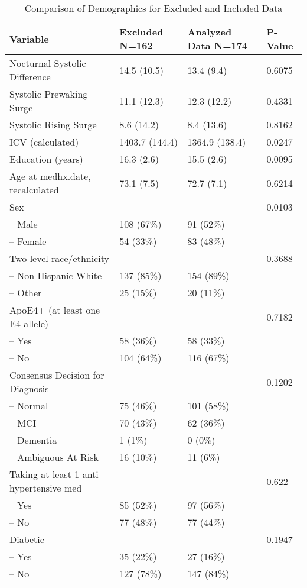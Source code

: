 \documentclass[10pt]{article}\usepackage[]{graphicx}\usepackage[]{color}
\begin{document}
\begin{table}[ht]
\centering
\caption{Comparison of Demographics for Excluded and Included Data} 
\begin{tabular}{llll}
  \toprule
Variable & \parbox{.5in}{Excluded N=162} & \parbox{.9in}{Analyzed Data N=174} & P-Value \\ 
  \midrule
Nocturnal Systolic Difference & 14.5 (10.5) & 13.4 (9.4) & 0.6075 \\ 
  Systolic Prewaking Surge & 11.1 (12.3) & 12.3 (12.2) & 0.4331 \\ 
  Systolic Rising Surge & 8.6 (14.2) & 8.4 (13.6) & 0.8162 \\ 
  ICV (calculated) & 1403.7 (144.4) & 1364.9 (138.4) & 0.0247 \\ 
  Education (years) & 16.3 (2.6) & 15.5 (2.6) & 0.0095 \\ 
  Age at medhx.date, recalculated & 73.1 (7.5) & 72.7 (7.1) & 0.6214 \\ 
  Sex &  &  & 0.0103 \\ 
  -- Male & 108 (67\%) & 91 (52\%) &  \\ 
  -- Female & 54 (33\%) & 83 (48\%) &  \\ 
  Two-level race/ethnicity &  &  & 0.3688 \\ 
  -- Non-Hispanic White & 137 (85\%) & 154 (89\%) &  \\ 
  -- Other & 25 (15\%) & 20 (11\%) &  \\ 
  ApoE4+ (at least one E4 allele) &  &  & 0.7182 \\ 
  -- Yes & 58 (36\%) & 58 (33\%) &  \\ 
  -- No & 104 (64\%) & 116 (67\%) &  \\ 
  Consensus Decision for Diagnosis &  &  & 0.1202 \\ 
  -- Normal & 75 (46\%) & 101 (58\%) &  \\ 
  -- MCI & 70 (43\%) & 62 (36\%) &  \\ 
  -- Dementia & 1 (1\%) & 0 (0\%) &  \\ 
  -- Ambiguous At Risk & 16 (10\%) & 11 (6\%) &  \\ 
  Taking at least 1 anti-hypertensive med &  &  & 0.622 \\ 
  -- Yes & 85 (52\%) & 97 (56\%) &  \\ 
  -- No & 77 (48\%) & 77 (44\%) &  \\ 
  Diabetic &  &  & 0.1947 \\ 
  -- Yes & 35 (22\%) & 27 (16\%) &  \\ 
  -- No & 127 (78\%) & 147 (84\%) &  \\ 

\end{tabular}
\end{table}
\end{document}
